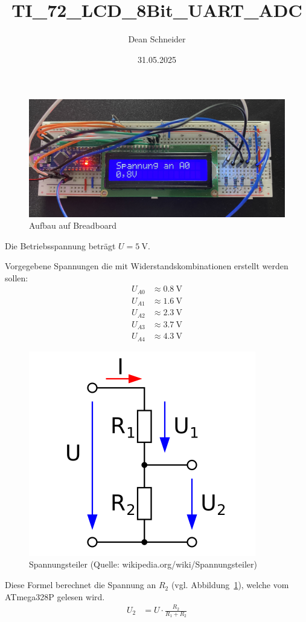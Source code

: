 \documentclass{article}
\title{TI\_72\_LCD\_8Bit\_UART\_ADC}
\author{Dean Schneider}
\date{31.05.2025}
\begin{document}
\maketitle
\begin{figure}[H]
    \centering
    \includegraphics[width=0.8\linewidth]{schaltung.jpeg}
    \caption{Aufbau auf Breadboard}
\end{figure}

Die Betriebsspannung beträgt $U = \SI{5}{\volt}$.

Vorgegebene Spannungen die mit Widerstandskombinationen erstellt werden sollen:
\begin{align*}
    U_{A0} &\approx \SI{0.8}{\volt}\\
    U_{A1} &\approx \SI{1.6}{\volt}\\
    U_{A2} &\approx \SI{2.3}{\volt}\\
    U_{A3} &\approx \SI{3.7}{\volt}\\
    U_{A4} &\approx \SI{4.3}{\volt} 
\end{align*}

\begin{figure}
    \centering
    \includegraphics[width=0.4\linewidth]{spannungsteiler.png}
    \caption{Spannungsteiler (Quelle: wikipedia.org/wiki/Spannungsteiler)}
    \label{fig:spannungsteiler}
\end{figure}

\newpage
Diese Formel berechnet die Spannung an $R_2$ (vgl. Abbildung~\ref{fig:spannungsteiler}),
welche vom ATmega328P gelesen wird.
\begin{align*}
    U_2 &= U \cdot \frac{R_2}{R_1 + R_2}\\
\end{align*}
\end{document}
